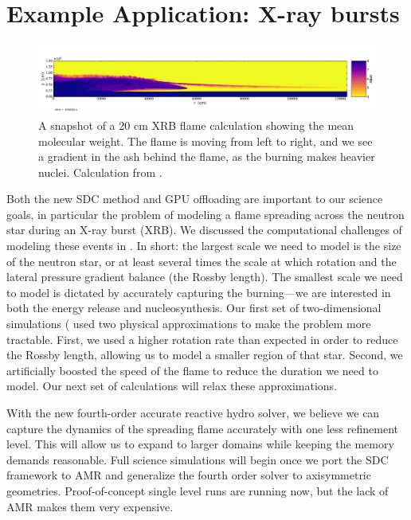 \documentclass[a4paper]{jpconf}
\begin{document}
\section{Example Application: X-ray bursts}

\begin{figure}[t]
\centering
\includegraphics[width=\linewidth]{flame_wave_smallplt131070_slice}
\caption{\label{fig:xrb} A snapshot of a 20 cm XRB flame calculation showing
the mean molecular weight.  The flame is moving from left to right, and we see
a gradient in the ash behind the flame, as the burning makes heavier nuclei.  
Calculation from \cite{eiden:2019}.}
\end{figure}

Both the new SDC method and GPU offloading are important to our
science goals, in particular the problem of modeling a flame spreading
across the neutron star during an X-ray burst (XRB).  We discussed the
computational challenges of modeling these events in
\cite{astronum:2018}.  In short: the largest scale we need to model is
the size of the neutron star, or at least several times the scale at
which rotation and the lateral pressure gradient balance (the Rossby
length).  The smallest scale we need to model is dictated by
accurately capturing the burning---we are interested in both the
energy release and nucleosynthesis.  Our first set of two-dimensional simulations
(\cite{astronum:2018,eiden:2019} used two physical approximations to
make the problem more tractable.  First, we used a higher rotation
rate than expected in order to reduce the Rossby length, allowing us
to model a smaller region of that star.  Second, we artificially
boosted the speed of the flame to reduce the duration we need to
model.  Our next set of calculations will relax these approximations.

With the new fourth-order accurate reactive hydro solver, we believe
we can capture the dynamics of the spreading flame accurately with one
less refinement level.  This will allow us to expand to larger domains
while keeping the memory demands reasonable.  Full science simulations
will begin once we port the SDC framework to AMR and generalize the
fourth order solver to axisymmetric geometries.  Proof-of-concept single
level runs are running now, but the lack of AMR makes them very
expensive.
\end{document}
